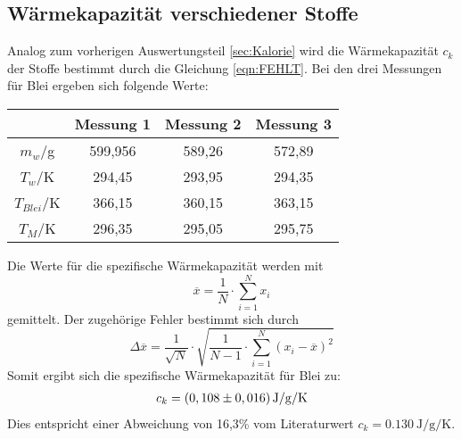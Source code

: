 \subsection{Wärmekapazität verschiedener Stoffe}
\label{sec:verschiedeneStoffe}
Analog zum vorherigen Auswertungsteil \ref{sec:Kalorie} wird die Wärmekapazität $c_k$ der Stoffe bestimmt durch die Gleichung \ref{eqn:FEHLT}.
Bei den drei Messungen für Blei ergeben sich folgende Werte:
\begin{table}
  \centering
  \label{tab:WerteBlei}
  \begin{tabular}{c c c c}
   \toprule
   & Messung 1 & Messung 2 & Messung 3 \\
   \midrule
   $m_w$/g & 599,956 & 589,26 & 572,89 \\
   $T_w$/K & 294,45 & 293,95 & 294,35 \\
   $T_{Blei}$/K & 366,15 & 360,15 & 363,15 \\
   $T_M$/K & 296,35 & 295,05 & 295,75 \\
   \bottomrule
  \end{tabular}
\end{table}
\newpage
Die Werte für die spezifische Wärmekapazität werden mit
\begin{equation}
  \overline{x} = \frac{1}{N} \cdot \sum_{i=1}^N x_i
\end{equation}
gemittelt. Der zugehörige Fehler bestimmt sich durch 
\begin{equation}
  \Delta \overline{x} = \frac{1}{\sqrt{N}} \cdot \sqrt{\frac{1}{N-1} \cdot \sum_{i=1}^N \left(x_i - \overline{x}\right)^2}
\end{equation}
Somit ergibt sich die spezifische Wärmekapazität für Blei zu:
\begin{align*}
  c_k = \left(0,108 \pm 0,016 \right) \si{{\joule\per\gram\per\kelvin}}
\end{align*}
Dies entspricht einer Abweichung von 16,3\% vom Literaturwert $c_k = \SI{0,130}{\joule\per\gram\per\kelvin}$.